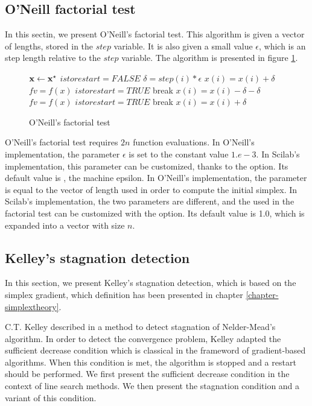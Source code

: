 \subsection{O'Neill factorial test}

In this sectin, we present O'Neill's factorial test.
This algorithm is given a vector of lengths, stored in the 
$step$ variable. It is also given a small value $\epsilon$, which 
is an step length relative to the $step$ variable.
The algorithm is presented in figure \ref{algo-factorialtest}.

\begin{figure}[htbp]
\begin{algorithmic}
\STATE $\mathbf{x} \gets \mathbf{x}^\star$
\STATE $istorestart = FALSE$
  \STATE $\delta = step ( i ) * \epsilon$
  \STATE $x ( i ) = x ( i ) + \delta$
  \STATE $fv = f ( x ) $
    \STATE $istorestart = TRUE$
    \STATE    break
  \ENDIF
  \STATE $x ( i ) = x ( i ) - \delta - \delta $
  \STATE $fv = f ( x ) $
    \STATE $istorestart = TRUE$
    \STATE    break
  \ENDIF
  \STATE $x ( i ) = x ( i ) + \delta$
\ENDFOR
\end{algorithmic}
\caption{O'Neill's factorial test}
\label{algo-factorialtest}
\end{figure}

O'Neill's factorial test requires $2n$ function evaluations. In O'Neill's implementation, the parameter
$\epsilon$ is set to the constant value $1.e-3$.
In Scilab's implementation, this parameter can be customized, 
thanks to the  option. Its default value is ,
the machine epsilon. In O'Neill's implementation, the parameter 
is equal to the vector of length used in order to compute the initial 
simplex. In Scilab's implementation, the two parameters are different,
and the  used in the factorial test can be customized 
with the  option. Its default value is 1.0, which is 
expanded into a vector with size $n$.

\subsection{Kelley's stagnation detection}

In this section, we present Kelley's stagnation detection,
which is based on the simplex gradient, which definition has been 
presented in chapter \ref{chapter-simplextheory}.

C.T. Kelley described in \cite{589283} a method to detect stagnation
of Nelder-Mead's algorithm. 
In order to detect the convergence problem, Kelley adapted the sufficient decrease 
condition which is classical in the frameword of gradient-based algorithms.
When this condition is met, the algorithm is stopped and a restart should be performed.
We first present the sufficient decrease condition in the context of 
line search methods. We then present the stagnation condition and a variant of this 
condition.


